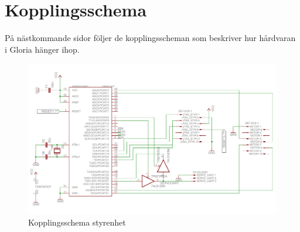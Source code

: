 \section{Kopplingsschema} \label{kopplingsschema}

På nästkommande sidor följer de kopplingsscheman som beskriver hur hårdvaran i Gloria hänger ihop.

\begin{figure}[h!]
	\centering
	\includegraphics[scale=0.55,angle=90]{grafik/kopplingsschema-drive_unit}
	\caption{Kopplingsschema styrenhet} \label{kopplingsschema-styrenhet}
\end{figure}

